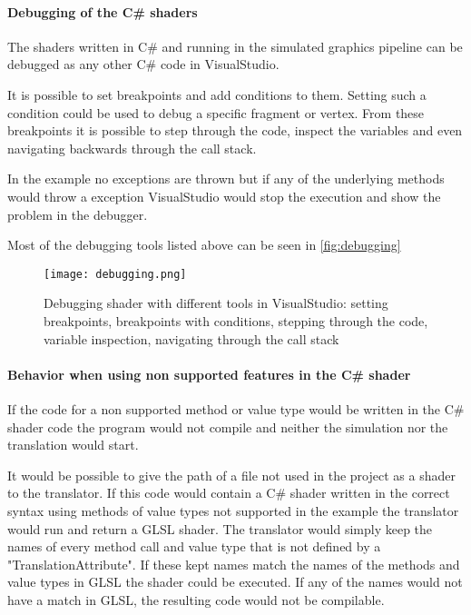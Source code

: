 \paragraph{Debugging of the C\# shaders}

The shaders written in C\# and running in the simulated graphics pipeline can be debugged as any other C\# code in VisualStudio.

It is possible to set breakpoints and add conditions to them. Setting such a condition could be used to debug a specific fragment or vertex. From these breakpoints it is possible to step through the code, inspect the variables and even navigating backwards through the call stack.

In the example no exceptions are thrown but if any of the underlying methods would throw a exception VisualStudio would stop the execution and show the problem in the debugger.

Most of the debugging tools listed above can be seen in \autoref{fig:debugging}

\begin{figure}[h!]
  \centering 
  \texttt{[image: debugging.png]}
  \caption[Screenshot of debug screen within VisualStudio]{Debugging shader with different tools in VisualStudio: setting breakpoints, breakpoints with conditions, stepping through the code, variable inspection, navigating through the call stack}
  \label{fig:debugging}
\end{figure}

\paragraph{Behavior when using non supported features in the C\# shader}

If the code for a non supported method or value type would be written in the C\# shader code the program would not compile and neither the simulation nor the translation would start.

It would be possible to give the path of a file not used in the project as a shader to the translator. If this code would contain a C\# shader written in the correct syntax using methods of value types not supported in the example the translator would run and return a GLSL shader. The translator would simply keep the names of every method call and value type that is not defined by a "TranslationAttribute". If these kept names match the names of the methods and value types in GLSL the shader could be executed. If any of the names would not have a match in GLSL, the resulting code would not be compilable.